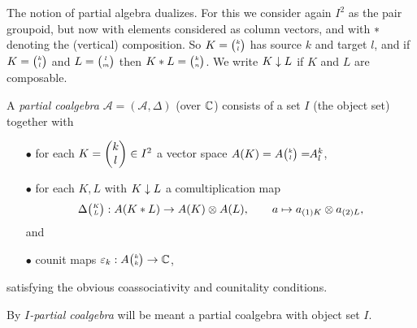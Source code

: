 
The notion of partial algebra dualizes. For this we consider again $I^2$ as the pair groupoid, but now with elements considered as column vectors, and with $*$ denoting the (vertical) composition. So $K={\tiny {\begin{pmatrix} k\\l\end{pmatrix}}}$ has source $k$ and target $l$, and if $K={\tiny {\begin{pmatrix} k\\l\end{pmatrix}}}$ and $L={\tiny {\begin{pmatrix} l\\m\end{pmatrix}}}$ then $K* L = {\tiny {\begin{pmatrix} k\\n\end{pmatrix}}}$. We write $K\downarrow L$ if $K$ and $L$ are composable. 

\begin{Def} A \emph{partial coalgebra} $\mathscr{A}=(\mathscr{A},\Delta)$ (over $\mathbb{C}$) consists of a set $I$ (the object set) together with 
\begin{itemize}
\item[$\bullet$] for each $K=\begin{pmatrix} k \\ l\end{pmatrix}\in I^2$ a vector space $A(K) = A{\tiny {\begin{pmatrix} k\\l\end{pmatrix}}}=\!\!A^{k}_{l}$,
\item[$\bullet$] for each $K,L$ with $K\downarrow L$ a comultiplication map \[\Delta{\tiny {\begin{pmatrix} K\\L\end{pmatrix}}}:A(K*L)\rightarrow A(K)\otimes A(L),\qquad a \mapsto a_{(1)K}\otimes a_{(2)L},\] and 
\item[$\bullet$] counit maps $\varepsilon_k:A{\tiny {\begin{pmatrix} k\\k\end{pmatrix}}}\rightarrow \mathbb{C}$,
\end{itemize} 
satisfying the obvious coassociativity and counitality conditions.

By \emph{$I$-partial coalgebra} will be meant a partial coalgebra with object set $I$.
\end{Def}

